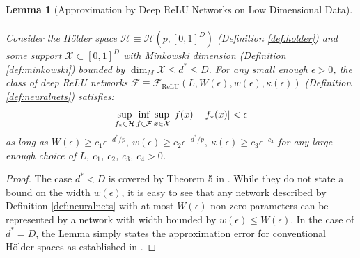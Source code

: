 \documentclass[12pt]{article}
\newcommand{\newinf}{\mathop{\mathrm{inf}\vphantom{\mathrm{sup}}}}
\theoremstyle{myplain}
\newtheorem{lemma}{Lemma}[section]
\theoremstyle{definition}
\theoremstyle{definition}
\theoremstyle{remark}
\numberwithin{equation}{section}
\begin{document}
\begin{lemma}[Approximation by Deep ReLU Networks on Low Dimensional Data]\label{lem:approxminkowski}\ \\
Consider the Hölder space $\mathcal{H}\equiv\mathcal{H}\left(p,[0,1]^{D}\right)$ (Definition \ref{def:holder}) and some support ${\mathcal{X}}\subset [0,1]^{D}$ with Minkowski dimension (Definition \ref{def:minkowski}) bounded by $\operatorname{dim}_M {\mathcal{X}} \leq d^*\leq D$. For any small enough $\epsilon>0$, the class of deep ReLU networks $\mathcal{F}\equiv\mathcal{F}_{\mathrm{ReLU}}(L, W(\epsilon), w(\epsilon), \kappa(\epsilon))$ (Definition \ref{def:neuralnets}) satisfies: \[\sup_{f_*\in \mathcal{H}} \newinf_{f\in\mathcal{F}} \sup_{x\in {\mathcal{X}}}  |f(x)-f_*(x)| < \epsilon\] as long as $W(\epsilon) \geq c_1 \epsilon^{-d^{*}/ p },\ w(\epsilon) \geq c_2 \epsilon^{-d^{*}/ p },\ \kappa(\epsilon)\geq c_3 \epsilon^{-c_4}$ for any large enough choice of $L$, $c_1$, $c_2$, $c_3$, $c_4>0$. 
\end{lemma}
\begin{proof}
The case $d^*< D$ is covered by Theorem 5 in \cite{minkowski}. While they do not state a bound on the width $w(\epsilon)$, it is easy to see that any network described by Definition \ref{def:neuralnets} with at most $W(\epsilon)$ non-zero parameters can be represented by a network with width bounded by $w(\epsilon)\leq W(\epsilon)$. In the case of $d^*=D$, the Lemma simply states the approximation error for conventional Hölder spaces as established in \cite{yarotsky2017error}.
\end{proof}
\end{document}
